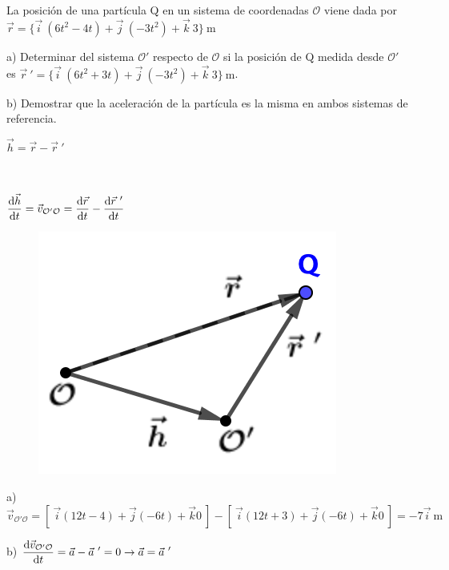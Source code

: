 \begin{prob}
La posición de una partícula Q en un sistema de coordenadas $\mathcal O$	viene dada por $\vec r=\{ \vec i\ (6t^2-4t)+\vec j\ (-3t^2)+\vec k\ 3\}\ \mathrm{m}$

a) Determinar del sistema $\mathcal O'$ respecto de $\mathcal O$ si la posición de Q medida desde $\mathcal O'$ es $\vec r\ '=\{ \vec i\ (6t^2+3t)+\vec j\ (-3t^2)+\vec k\ 3\}\ \mathrm{m}$.

b) Demostrar que la aceleración de la partícula es la misma en ambos sistemas de referencia.
\end{prob}

\begin{multicols}{2}
	$\vec h=\vec r-\vec r\ '$
	
	$\quad$
	
	$\displaystyle \dv{\vec h}{t} = \vec v_{\mathcal O' \mathcal O}=\dv{\vec r}{t}-\dv{\vec r\ '}{t}$
	\begin{figure}[H]
	\centering
	\includegraphics[width=.3\textwidth]{imagenes/imagenes10/T10IM08.png}
\end{figure}
\end{multicols}
a) $\vec v_{\mathcal O' \mathcal O}=[\ \vec i (12t-4)+\vec j (-6t)+\vec k 0 \ ]-[\ \vec i(12t+3)+\vec j(-6t)+\vec k 0  \ ]=-7\vec i\ \text{m}$

b) $\displaystyle \dv{\vec v_{\mathcal O' \mathcal O}}{t}=\vec a -\vec a \ '=0 \to \vec a=\vec a \ '$

